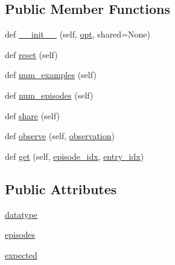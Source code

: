 \subsection*{Public Member Functions}
\begin{DoxyCompactItemize}
\item 
def \hyperlink{classparlai_1_1tasks_1_1onecommon_1_1agents_1_1OneCommonTeacher_aafdf8313f407516bd2143e2839534a0c}{\+\_\+\+\_\+init\+\_\+\+\_\+} (self, \hyperlink{classparlai_1_1core_1_1agents_1_1Teacher_a3ce6243860ce978a897922863ed32fa4}{opt}, shared=None)
\item 
def \hyperlink{classparlai_1_1tasks_1_1onecommon_1_1agents_1_1OneCommonTeacher_ac43c4e0932ed085c78357d74a767cf8f}{reset} (self)
\item 
def \hyperlink{classparlai_1_1tasks_1_1onecommon_1_1agents_1_1OneCommonTeacher_a192d3b28f7eb54a176c364c992198983}{num\+\_\+examples} (self)
\item 
def \hyperlink{classparlai_1_1tasks_1_1onecommon_1_1agents_1_1OneCommonTeacher_affbbea1344d177d8571245c5f6abfc0c}{num\+\_\+episodes} (self)
\item 
def \hyperlink{classparlai_1_1tasks_1_1onecommon_1_1agents_1_1OneCommonTeacher_aca977bb2656a4cd3cd749c814d1e8bd1}{share} (self)
\item 
def \hyperlink{classparlai_1_1tasks_1_1onecommon_1_1agents_1_1OneCommonTeacher_a74edf945f0c5a938b987aa72c0f7067d}{observe} (self, \hyperlink{classparlai_1_1core_1_1agents_1_1Agent_aedbecc4b4aa7af7413882a0429e0f1db}{observation})
\item 
def \hyperlink{classparlai_1_1tasks_1_1onecommon_1_1agents_1_1OneCommonTeacher_add4f390c9e8aad4a140d560c80db87c1}{get} (self, \hyperlink{classparlai_1_1core_1_1teachers_1_1FixedDialogTeacher_afd4ebab8063eb42d182d30a1a41f133e}{episode\+\_\+idx}, \hyperlink{classparlai_1_1core_1_1teachers_1_1FixedDialogTeacher_ae3201b15f3c3b46a2f3511bad9b43e7d}{entry\+\_\+idx})
\end{DoxyCompactItemize}
\subsection*{Public Attributes}
\begin{DoxyCompactItemize}
\item 
\hyperlink{classparlai_1_1tasks_1_1onecommon_1_1agents_1_1OneCommonTeacher_a7c95a83fca48d1308296cd641758f6c3}{datatype}
\item 
\hyperlink{classparlai_1_1tasks_1_1onecommon_1_1agents_1_1OneCommonTeacher_ad797e00c23d0418d1747986a238de727}{episodes}
\item 
\hyperlink{classparlai_1_1tasks_1_1onecommon_1_1agents_1_1OneCommonTeacher_a662452ba474f18fbfc222984bc0bb9c5}{expected}
\end{DoxyCompactItemize}


